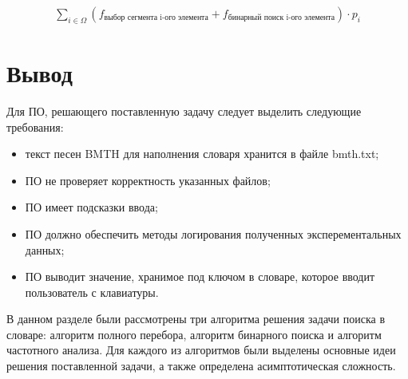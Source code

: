 \begin{equation}
	\label{for:segment}
	\begin{aligned}
		\sum_{i \in \Omega}{\left(f_{\text{выбор сегмента i-ого элемента}} + f_{\text{бинарный поиск i-ого элемента}}\right)} \cdot p_i
	\end{aligned}
\end{equation}


\section{Вывод}

Для ПО, решающего поставленную задачу следует выделить следующие требования: 
\begin{itemize}
	\item текст песен BMTH для наполнения словаря хранится в файле bmth.txt;
	\item ПО не проверяет корректность указанных файлов;
	\item ПО имеет подсказки ввода;
	\item ПО должно обеспечить методы логирования полученных эксперементальных данных;	
	\item ПО выводит значение, хранимое под ключом в словаре, которое вводит пользователь с клавиатуры.
\end{itemize}

В данном разделе были рассмотрены три алгоритма решения задачи поиска в словаре: алгоритм полного перебора, алгоритм бинарного поиска и алгоритм частотного анализа. Для каждого из алгоритмов были выделены основные идеи решения поставленной задачи, а также определена асимптотическая сложность.


